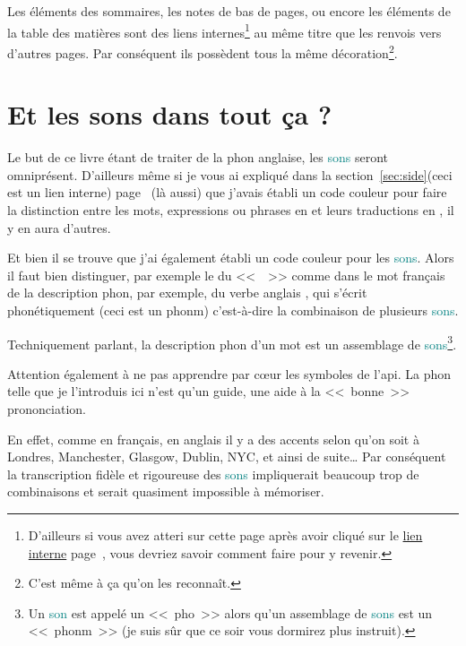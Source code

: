 Les éléments des sommaires, les notes de bas de pages, ou encore les
éléments de la table des matières sont des \hypertarget{linkin}{liens
  internes}\footnote{D'ailleurs si vous avez atteri sur cette page
  après avoir cliqué sur le \hyperlink{retour}{lien interne}
  page~\pageref{retour}, vous devriez savoir comment faire pour y
  revenir.} au même titre que les renvois vers d'autres pages. Par
conséquent ils possèdent tous la même décoration\footnote{C'est même à
ça qu'on les reconnaît.}.  

\newpage

\section{Et les sons dans tout ça ?}\label{sec:phonetics}

Le but de ce livre étant de traiter de la \gls{phon} anglaise, les
\textcolor{teal}{sons} seront omniprésent. D'ailleurs même si je vous ai expliqué dans
la section~\ref{sec:side}(ceci est un lien interne)
page~\pageref{sec:side} (là aussi) que j'avais établi un code
couleur pour faire la distinction entre les mots, expressions ou
phrases en  et leurs traductions en , il
y en aura d'autres.

Et bien il se trouve que j'ai également établi un code couleur pour
les \textcolor{teal}{sons}. Alors il faut bien distinguer, par exemple
le \son {} du <<~~>> comme dans le mot français  de la
description \gls{phon}, par exemple, du verbe anglais , qui
s'écrit phonétiquement  (ceci est un \gls{phonm}) c'est-à-dire
la combinaison de plusieurs \textcolor{teal}{sons}.

Techniquement parlant, la description \gls{phon} d'un mot est un
assemblage de \textcolor{teal}{sons}\footnote{Un \textcolor{teal}{son}
  est appelé un <<~\gls{pho}~>> alors qu'un assemblage de
  \textcolor{teal}{sons} est un <<~\gls{phonm}~>> (je suis sûr que ce soir
  vous dormirez plus instruit).}.

Attention également à ne pas apprendre par c{\oe}ur les symboles de
l'\acrfull{api}. La \gls{phon} telle que je
l'introduis ici n'est qu'un guide, une aide à la <<~bonne~>>
prononciation.

En effet, comme en français, en anglais il y a des accents selon qu'on
soit à Londres, Manchester, Glasgow, Dublin, NYC, et ainsi de suite\dots\xspace Par conséquent
la transcription fidèle et rigoureuse des \textcolor{teal}{sons}
impliquerait beaucoup trop de combinaisons et serait quasiment
impossible à mémoriser.

